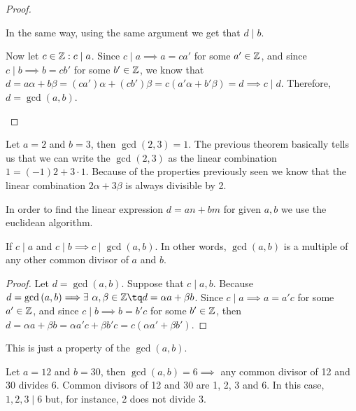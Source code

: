 \begin{proof}
\begin{itemize}
            In the same way, using the same argument we get that $d\mid b$.

            Now let $c\in\mathbb{Z}: c\mid a$. Since $c\mid a\implies a = ca'$ for some $a'\in\mathbb{Z}$, and since
            $c\mid b\implies b = cb'$ for some $b'\in\mathbb{Z}$, we know that $d = a\alpha + b\beta = \left(
            ca'\right)\alpha + \left( cb'\right)\beta = c\left( a'\alpha + b'\beta \right) = d\implies
            c\mid d$. Therefore, $d = \gcd\left( a, b \right)$.
    \end{itemize}
\end{proof}

\begin{example}
    Let $a = 2$ and $b = 3$, then $\gcd\left( 2, 3 \right) = 1$. The previous theorem basically tells us
    that we can write the $\gcd\left( 2, 3 \right) $ as the linear combination $1 = \left( -1 \right)2 +
    3\cdot 1$. Because of the properties previously seen we know that the linear combination $2\alpha +
    3\beta$ is always divisible by 2.
\end{example}

In order to find the linear expression $d = an + bm$ for given $a, b$ we use the euclidean algorithm.


\begin{prop}
    If $c\mid a$ and $c\mid b\implies c\mid\gcd\left( a, b \right) $. In other words, $\gcd\left( a, b \right)$
    is a multiple of any other common divisor of $a$ and $b$.
\end{prop}

\begin{proof}
    Let $d = \gcd\left( a, b \right)$. Suppose that $c\mid a, b$. Because $d = \gcd\left( a, b \right)\implies
    \exists\ \alpha, \beta\in\Z\tq d = \alpha a + \beta b$. Since $c\mid a\implies a = a'c$ for some $a'\in\mathbb{Z}$,
    and since $c\mid b \implies b = b'c$ for some $b'\in\mathbb{Z}$, then $d = \alpha a + \beta b = \alpha a'c +
    \beta b'c = c\left( \alpha a' + \beta b' \right) $.
\end{proof}

\begin{remark}
    This is just a property of the $\gcd\left( a, b \right)$.
\end{remark}

\begin{example}
    Let $a = 12$ and $b = 30$, then $\gcd\left( a, b \right) = 6\implies $ any common divisor of 12 and 30
    divides 6. Common divisors of 12 and 30 are 1, 2, 3 and 6. In this case, $1, 2, 3\mid 6$ but, for instance,
    2 does not divide 3.
\end{example}

